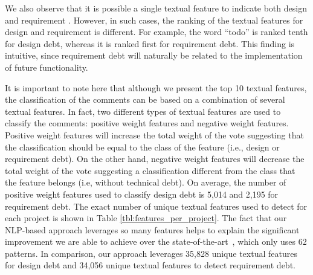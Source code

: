 We also observe that it is possible a single textual feature to indicate both design and requirement \SATD. However, in such cases, the ranking of the textual features for design and requirement \SATD is different. For example, the word ``todo'' is ranked tenth for design debt, whereas it is ranked first for requirement debt. This finding is intuitive, since requirement debt will naturally be related to the implementation of future functionality.

It is important to note here that although we present the top 10 textual features, the classification of the comments can be based on a combination of several textual features. In fact, two different types of textual features are used to classify the comments: positive weight features and negative weight features. Positive weight features will increase the total weight of the vote suggesting that the classification should be equal to the class of the feature (i.e., design or requirement debt). On the other hand, negative weight features will decrease the total weight of the vote suggesting a classification different from the class that the feature belongs (i.e, without technical debt). On average, the number of positive weight features used to classify design debt is 5,014 and 2,195 for requirement debt. The exact number of unique textual features used to detect \SATD for each project is shown in Table \ref{tbl:features_per_project}. The fact that our NLP-based approach leverages so many features helps to explain the significant improvement we are able to achieve over the state-of-the-art~\cite{Potdar2014ICSME}, which only uses 62 patterns. In comparison, our approach leverages 35,828 unique textual features for design debt and 34,056 unique textual features to detect requirement debt.


